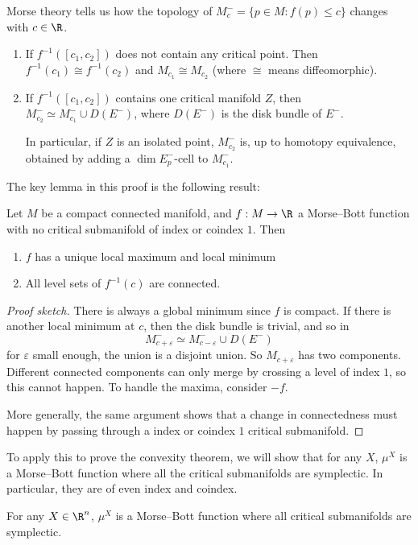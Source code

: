 \documentclass[a4paper]{article}
\begin{document}
Morse theory tells us how the topology of $M_c^- = \{p \in M: f(p) \leq c\}$ changes with $c \in \R$.
\begin{thm}\leavevmode
  \begin{enumerate}
    \item If $f^{-1}([c_1, c_2])$ does not contain any critical point. Then $f^{-1}(c_1) \cong f^{-1}(c_2)$ and $M_{c_1} \cong M_{c_2}$ (where $\cong$ means diffeomorphic).
    \item If $f^{-1}([c_1, c_2])$ contains one critical manifold $Z$, then $M_{c_2}^- \simeq M_{c_1}^- \cup D(E^-)$, where $D(E^-)$ is the disk bundle of $E^-$.

      In particular, if $Z$ is an isolated point, $M_{c_2}^-$ is, up to homotopy equivalence, obtained by adding a $\dim E_p^-$-cell to $M_{c_1}^-$.\fakeqed
  \end{enumerate}
\end{thm}
The key lemma in this proof is the following result:
\begin{lemma}
  Let $M$ be a compact connected manifold, and $f: M \to \R$ a Morse--Bott function with no critical submanifold of index or coindex $1$. Then
  \begin{enumerate}
    \item $f$ has a unique local maximum and local minimum
    \item All level sets of $f^{-1}(c)$ are connected.
  \end{enumerate}
\end{lemma}

\begin{proof}[Proof sketch]
  There is always a global minimum since $f$ is compact. If there is another local minimum at $c$, then the disk bundle is trivial, and so in
  \[
    M_{c + \varepsilon}^- \simeq M_{c - \varepsilon}^- \cup D(E^-)
  \]
  for $\varepsilon$ small enough, the union is a disjoint union. So $M_{c + \varepsilon}$ has two components. Different connected components can only merge by crossing a level of index $1$, so this cannot happen. To handle the maxima, consider $-f$.

  More generally, the same argument shows that a change in connectedness must happen by passing through a index or coindex $1$ critical submanifold.
\end{proof}

To apply this to prove the convexity theorem, we will show that for any $X$, $\mu^X$ is a Morse--Bott function where all the critical submanifolds are symplectic. In particular, they are of even index and coindex.
\begin{lemma}
  For any $X \in \R^n$, $\mu^X$ is a Morse--Bott function where all critical submanifolds are symplectic.
\end{lemma}
\end{document}
